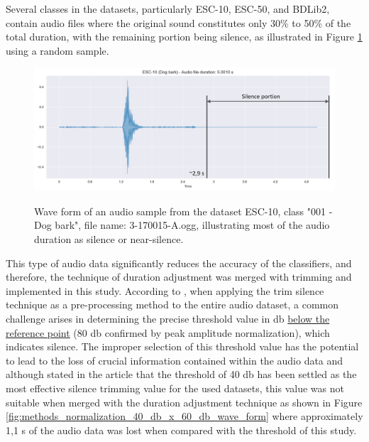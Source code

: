 Several classes in the datasets, particularly ESC-10, ESC-50, and BDLib2, contain audio files where the original sound constitutes only 30\% to 50\% of the total duration, with the remaining portion being silence, as illustrated in Figure \ref{fig:methods_normalization_original_wave_form} using a random sample.

\begin{figure}[htbp]
    \raggedright
        \caption{Wave form of an audio sample from the dataset ESC-10, class "001 - Dog bark", file name: 3-170015-A.ogg, illustrating most of the audio duration as silence or near-silence.}
        \includegraphics[width=1\textwidth]{resources/images/050-methods/Methods_normalization_original.png}
        \label{fig:methods_normalization_original_wave_form}
\end{figure}

This type of audio data significantly reduces the accuracy of the classifiers, and therefore, the technique of duration adjustment was merged with trimming and implemented in this study. According to \textcite{Mmushtaq2020}, when applying the trim silence technique as a pre-processing method to the entire audio dataset, a common challenge arises in determining the precise threshold value in \gls{db} \underline{below the reference point} (80 \gls{db} confirmed by peak amplitude normalization), which indicates silence. The improper selection of this threshold value has the potential to lead to the loss of crucial information contained within the audio data and although stated in the article that the threshold of 40 \gls{db} has been settled as the most effective silence trimming value for the used datasets, this value was not suitable when merged with the duration adjustment technique as shown in Figure \ref{fig:methods_normalization_40_db_x_60_db_wave_form} where approximately 1,1 \gls{s} of the audio data was lost when compared with the threshold of this study.

